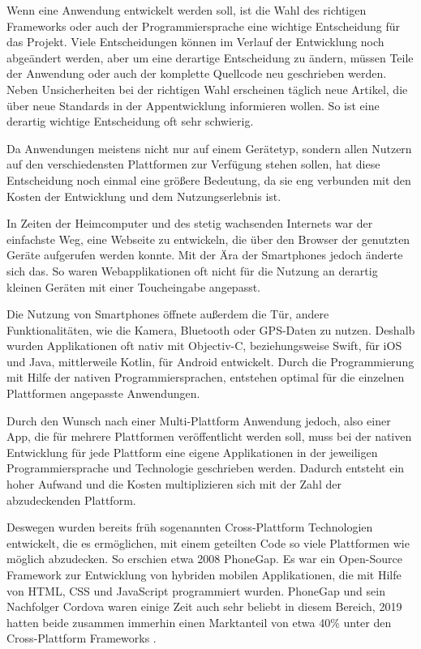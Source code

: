 Wenn eine Anwendung entwickelt werden soll, ist die Wahl des richtigen Frameworks oder auch der Programmiersprache eine wichtige Entscheidung für das Projekt. Viele Entscheidungen können im Verlauf der Entwicklung noch abgeändert werden, aber um eine derartige Entscheidung zu ändern, müssen Teile der Anwendung oder auch der komplette Quellcode neu geschrieben werden. Neben Unsicherheiten bei der richtigen Wahl erscheinen täglich neue Artikel, die über neue Standards in der Appentwicklung informieren wollen. So ist eine derartig wichtige Entscheidung oft sehr schwierig.

Da Anwendungen meistens nicht nur auf einem Gerätetyp, sondern allen Nutzern auf den verschiedensten Plattformen zur Verfügung stehen sollen, hat diese Entscheidung noch einmal eine größere Bedeutung, da sie eng verbunden mit den Kosten der Entwicklung und dem Nutzungserlebnis ist.

In Zeiten der Heimcomputer und des stetig wachsenden Internets war der einfachste Weg, eine Webseite zu entwickeln, die über den Browser der genutzten Geräte aufgerufen werden konnte. Mit der Ära der Smartphones jedoch änderte sich das. So waren Webapplikationen oft nicht für die Nutzung an derartig kleinen Geräten mit einer Toucheingabe angepasst.

Die Nutzung von Smartphones öffnete außerdem die Tür, andere Funktionalitäten, wie die Kamera, Bluetooth oder GPS-Daten zu nutzen. Deshalb wurden Applikationen oft nativ mit Objectiv-C, beziehungsweise Swift, für iOS und Java, mittlerweile Kotlin, für Android entwickelt. Durch die Programmierung mit Hilfe der nativen Programmiersprachen, entstehen optimal für die einzelnen Plattformen angepasste Anwendungen.

Durch den Wunsch nach einer Multi-Plattform Anwendung jedoch, also einer App, die für mehrere Plattformen veröffentlicht werden soll, muss bei der nativen Entwicklung für jede Plattform eine eigene Applikationen in der jeweiligen Programmiersprache und Technologie geschrieben werden. Dadurch entsteht ein hoher Aufwand und die Kosten multiplizieren sich mit der Zahl der abzudeckenden Plattform.

Deswegen wurden bereits früh sogenannten Cross-Plattform Technologien entwickelt, die es ermöglichen, mit einem geteilten Code so viele Plattformen wie möglich abzudecken. So erschien etwa 2008 PhoneGap. Es war ein Open-Source Framework zur Entwicklung von hybriden mobilen Applikationen, die mit Hilfe von HTML, CSS und JavaScript programmiert wurden. PhoneGap und sein Nachfolger Cordova waren einige Zeit auch sehr beliebt in diesem Bereich, 2019 hatten beide zusammen immerhin einen Marktanteil von etwa 40\% unter den Cross-Plattform Frameworks \cite{statist_CP_Framework}.

